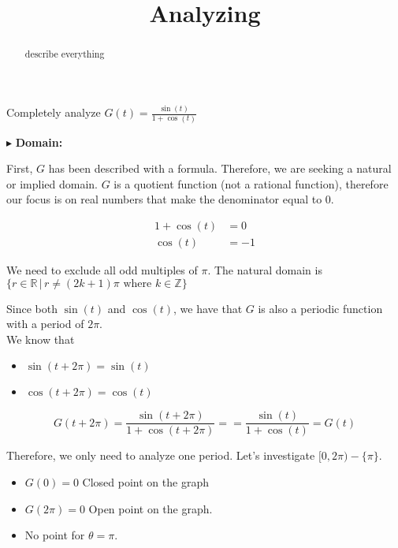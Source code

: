\documentclass{ximera}
\title{Analyzing}
\begin{document}
\begin{abstract}
describe everything
\end{abstract}
\maketitle







Completely analyze $G(t) = \frac{\sin(t)}{1 + \cos(t)}$

$\blacktriangleright$  \textbf{\textcolor{blue!55!black}{Domain: }} 

First, $G$ has been described with a formula.  Therefore, we are seeking a natural or implied domain. $G$ is a quotient function (not a rational function), therefore our focus is on real numbers that make the denominator equal to $0$.



\begin{align*}
1  + \cos(t) & = 0 \\
\cos(t) & = -1
\end{align*}


We need to exclude all odd multiples of $\pi$.  The natural domain is $\{  r \in \mathbb{R} \, | \, r \ne (2k+1)\pi \text{ where } k \in \mathbb{Z}   \}$



\begin{observation}  

Since both $\sin(t)$ and $\cos(t)$, we have that $G$ is also a periodic function with a period of $2\pi$. \\

We know that
\begin{itemize}
  \item $\sin(t + 2\pi) = \sin(t)$
  \item $\cos(t + 2\pi) = \cos(t)$
\end{itemize}

\[    G(t + 2\pi) = \frac{\sin(t+2\pi)}{1 + \cos(t+2\pi)} == \frac{\sin(t)}{1 + \cos(t)} = G(t)   \]



\end{observation}


Therefore, we only need to analyze one period.  Let's investigate $[0, 2\pi) - \{ \pi \}$.

\begin{itemize}
\item $G(0) = 0$   Closed point on the graph
\item $G(2\pi) = 0$  Open point on the graph.
\item No point for $\theta = \pi$.
\end{itemize}
\end{document}
